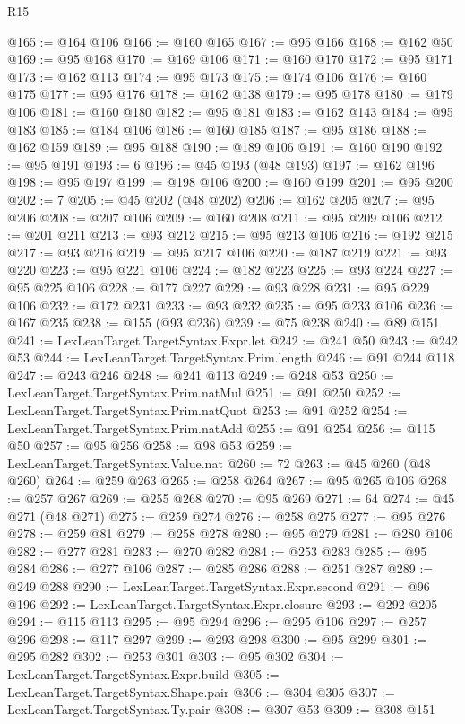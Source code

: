 \begin{lexlean}{R15}
\begin{coremodule}
@165 := @164 @106
@166 := @160 @165
@167 := @95 @166
@168 := @162 @50
@169 := @95 @168
@170 := @169 @106
@171 := @160 @170
@172 := @95 @171
@173 := @162 @113
@174 := @95 @173
@175 := @174 @106
@176 := @160 @175
@177 := @95 @176
@178 := @162 @138
@179 := @95 @178
@180 := @179 @106
@181 := @160 @180
@182 := @95 @181
@183 := @162 @143
@184 := @95 @183
@185 := @184 @106
@186 := @160 @185
@187 := @95 @186
@188 := @162 @159
@189 := @95 @188
@190 := @189 @106
@191 := @160 @190
@192 := @95 @191
@193 := 6
@196 := @45 @193 (@48 @193)
@197 := @162 @196
@198 := @95 @197
@199 := @198 @106
@200 := @160 @199
@201 := @95 @200
@202 := 7
@205 := @45 @202 (@48 @202)
@206 := @162 @205
@207 := @95 @206
@208 := @207 @106
@209 := @160 @208
@211 := @95 @209 @106
@212 := @201 @211
@213 := @93 @212
@215 := @95 @213 @106
@216 := @192 @215
@217 := @93 @216
@219 := @95 @217 @106
@220 := @187 @219
@221 := @93 @220
@223 := @95 @221 @106
@224 := @182 @223
@225 := @93 @224
@227 := @95 @225 @106
@228 := @177 @227
@229 := @93 @228
@231 := @95 @229 @106
@232 := @172 @231
@233 := @93 @232
@235 := @95 @233 @106
@236 := @167 @235
@238 := @155 (@93 @236)
@239 := @75 @238
@240 := @89 @151
@241 := LexLeanTarget.TargetSyntax.Expr.let
@242 := @241 @50
@243 := @242 @53
@244 := LexLeanTarget.TargetSyntax.Prim.length
@246 := @91 @244 @118
@247 := @243 @246
@248 := @241 @113
@249 := @248 @53
@250 := LexLeanTarget.TargetSyntax.Prim.natMul
@251 := @91 @250
@252 := LexLeanTarget.TargetSyntax.Prim.natQuot
@253 := @91 @252
@254 := LexLeanTarget.TargetSyntax.Prim.natAdd
@255 := @91 @254
@256 := @115 @50
@257 := @95 @256
@258 := @98 @53
@259 := LexLeanTarget.TargetSyntax.Value.nat
@260 := 72
@263 := @45 @260 (@48 @260)
@264 := @259 @263
@265 := @258 @264
@267 := @95 @265 @106
@268 := @257 @267
@269 := @255 @268
@270 := @95 @269
@271 := 64
@274 := @45 @271 (@48 @271)
@275 := @259 @274
@276 := @258 @275
@277 := @95 @276
@278 := @259 @81
@279 := @258 @278
@280 := @95 @279
@281 := @280 @106
@282 := @277 @281
@283 := @270 @282
@284 := @253 @283
@285 := @95 @284
@286 := @277 @106
@287 := @285 @286
@288 := @251 @287
@289 := @249 @288
@290 := LexLeanTarget.TargetSyntax.Expr.second
@291 := @96 @196
@292 := LexLeanTarget.TargetSyntax.Expr.closure
@293 := @292 @205
@294 := @115 @113
@295 := @95 @294
@296 := @295 @106
@297 := @257 @296
@298 := @117 @297
@299 := @293 @298
@300 := @95 @299
@301 := @295 @282
@302 := @253 @301
@303 := @95 @302
@304 := LexLeanTarget.TargetSyntax.Expr.build
@305 := LexLeanTarget.TargetSyntax.Shape.pair
@306 := @304 @305
@307 := LexLeanTarget.TargetSyntax.Ty.pair
@308 := @307 @53
@309 := @308 @151

\end{coremodule}
\end{lexlean}
